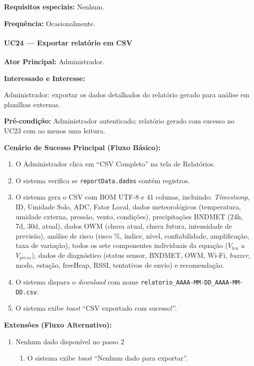 \textbf{Requisitos especiais:} Nenhum.

\textbf{Frequência:} Ocasionalmente.

\paragraph{UC24 --- Exportar relatório em CSV}\hfill\break

\textbf{Ator Principal:} Administrador.

\textbf{Interessado e Interesse:}

Administrador: exportar os dados detalhados do relatório
gerado para análise em planilhas externas.

\textbf{Pré-condição:} Administrador autenticado;
relatório gerado com sucesso no UC23 com ao menos
uma leitura.

\textbf{Cenário de Sucesso Principal (Fluxo Básico):}
\begin{enumerate}
  \item O Administrador clica em ``CSV Completo'' na
        tela de Relatórios.
  \item O sistema verifica se \texttt{reportData.dados}
        contém registros.
  \item O sistema gera o CSV com BOM UTF-8 e 41 colunas,
        incluindo: \textit{Timestamp}, ID, Umidade Solo,
        ADC, Fator Local, dados meteorológicos (temperatura,
        umidade externa, pressão, vento, condições),
        precipitações BNDMET (24h, 7d, 30d, atual),
        dados OWM (chuva atual, chuva futura, intensidade
        de previsão), análise de risco (risco \%, índice,
        nível, confiabilidade, amplificação, taxa de
        variação), todos os sete componentes individuais
        da equação ($V_{len}$ a $V_{press}$), dados de
        diagnóstico (status sensor, BNDMET, OWM, Wi-Fi,
        \textit{buzzer}, modo, estação, freeHeap, RSSI,
        tentativas de envio) e recomendação.
  \item O sistema dispara o \textit{download} com nome
        \texttt{relatorio\_AAAA-MM-DD\_AAAA-MM-DD.csv}.
  \item O sistema exibe \textit{toast}
        ``CSV exportado com sucesso!''.
\end{enumerate}

\textbf{Extensões (Fluxo Alternativo):}

\begin{enumerate}
  \renewcommand{\theenumi}{2a}
  \renewcommand{\labelenumi}{\theenumi.}
  \item Nenhum dado disponível no passo 2
  \begin{enumerate}
  \item O sistema exibe \textit{toast}
        ``Nenhum dado para exportar''.
  \end{enumerate}
\end{enumerate}

